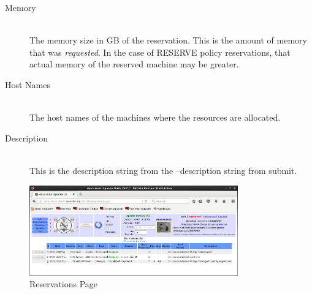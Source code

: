 \begin{description}
\item[Memory] \hfill \\
  The memory size in GB of the reservation.  This is the amount of memory that
  was {\em requested}.  In the case of RESERVE policy reservations, that actual memory
  of the reserved machine may be greater.
  
\item[Host Names] \hfill \\
  The host names of the machines where the resources are allocated.
  
\item[Description] \hfill \\
  This is the description string from the --description string from submit.
\end{description}

    \begin{figure}[ht!]
    \centering
    \includegraphics[width=90mm]{images/ducc-webserver/Reservations.png}
    \caption{Reservations Page}
    \end{figure}
